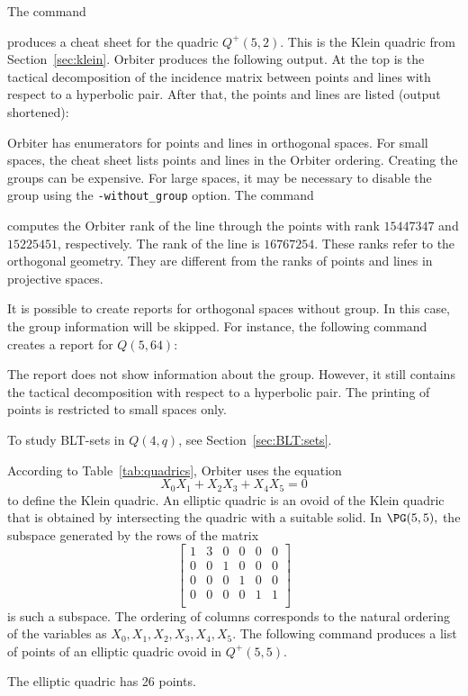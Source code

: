 \bigskip


The command 
{\tt

}
produces a cheat sheet for the quadric $Q^+(5,2)$. 
This is the Klein quadric from Section~\ref{sec:klein}.
Orbiter produces the following output. 
At the top is the tactical decomposition of the incidence matrix between points and lines 
with respect to a hyperbolic pair. 
After that, the points and lines are listed (output shortened):
\begin{mdframed}[style=MyFrame]

\end{mdframed}
Orbiter has enumerators for points and lines in orthogonal spaces. 
For small spaces, 
the cheat sheet lists points and lines in the Orbiter ordering.
Creating the groups can be expensive.
For large spaces, it may be necessary 
to disable the group using the \verb'-without_group' option.
The command 
{\tt

}
computes the Orbiter rank of the line through 
the points with rank $15447347$ and $15225451$, respectively.
The rank of the line is $16767254$.
These ranks refer to the orthogonal geometry. 
They are different from the ranks of points and lines in projective spaces.

\bigskip

It is possible to create reports for orthogonal spaces without group. 
In this case, the group information will be skipped. 
For instance, the following command creates a report for $Q(5,64)$:
{\tt

}
The report does not show information about the group. 
However, it still contains the tactical decomposition with respect to a hyperbolic pair. 
The printing of points is restricted to small spaces only.

\bigskip

\begin{mdframed}[style=MyFrame]

\end{mdframed}


\bigskip

To study BLT-sets in $Q(4,q)$, see Section~\ref{sec:BLT:sets}.

\bigskip


According to Table~\ref{tab:quadrics}, Orbiter uses the equation 
$$
X_0X_1+
X_2X_3+
X_4X_5 = 0
$$
to define the Klein quadric.
An elliptic quadric is an ovoid of the Klein quadric that is 
obtained by intersecting the quadric with a suitable solid.
In $\PG(5,5),$
the subspace generated by the rows of the matrix
$$
\left[
\begin{array}{cccccc}
1&3&0&0&0&0 \\
0&0&1&0&0&0 \\
0&0&0&1&0&0 \\
0&0&0&0&1&1 \\
\end{array}
\right]
$$
is such a subspace.
The ordering of columns corresponds to the natural 
ordering of the variables as $X_0, X_1, X_2, X_3, X_4, X_5.$
The following command produces a list 
of points of an elliptic quadric ovoid in $Q^+(5,5).$
{\tt

}
The elliptic quadric has 26 points.



